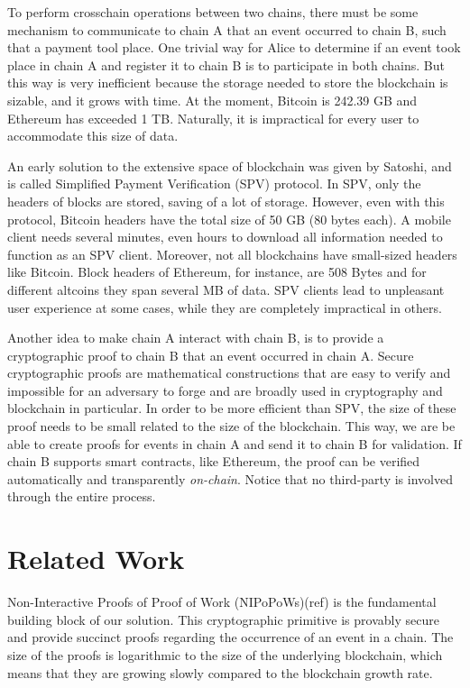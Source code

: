 To perform crosschain operations between two chains, there must be some
mechanism to communicate to chain A that an event occurred to chain B, such
that a payment tool place. One trivial way for Alice to determine if an event
took place in chain A and register it to chain B is to participate in both
chains.  But this way is very inefficient because the storage needed to store
the blockchain is sizable, and it grows with time. At the moment, Bitcoin is
242.39 GB and Ethereum has exceeded 1 TB. Naturally, it is impractical for
every user to accommodate this size of data.

An early solution to the extensive space of blockchain was given by Satoshi,
and is called Simplified Payment Verification (SPV) protocol. In SPV, only the
headers of blocks are stored, saving of a lot of storage. However, even with
this protocol, Bitcoin headers have the total size of 50 GB (80 bytes each). A
mobile client needs several minutes, even hours to download all information
needed to function as an SPV client. Moreover, not all blockchains have
small-sized headers like Bitcoin. Block headers of Ethereum, for instance, are
508 Bytes and for different altcoins they span several MB of data. SPV clients
lead to unpleasant user experience at some cases, while they are completely
impractical in others.

Another idea to make chain A interact with chain B, is to provide a
cryptographic proof to chain B that an event occurred in chain A. Secure
cryptographic proofs are mathematical constructions that are easy to verify and
impossible for an adversary to forge and are broadly used in cryptography and
blockchain in particular. In order to be more efficient than SPV, the size of
these proof needs to be small related to the size of the blockchain. This way,
we are be able to create proofs for events in chain A and send it to chain B
for validation. If chain B supports smart contracts, like Ethereum, the proof
can be verified automatically and transparently \emph{on-chain}. Notice that no
third-party is involved through the entire process.

\section{Related Work}

Non-Interactive Proofs of Proof of Work (NIPoPoWs)(ref) is the fundamental
building block of our solution. This cryptographic primitive is provably secure
and provide succinct proofs regarding the occurrence of an event in a chain.
The size of the proofs is logarithmic to the size of the underlying blockchain,
which means that they are growing slowly compared to the blockchain growth
rate.

